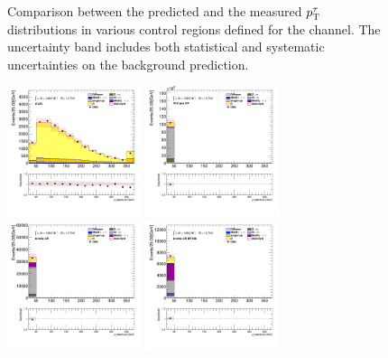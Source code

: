 \begin{figure}[!htp]
\begin{center}
			\end{center}
			\caption{
			Comparison between the predicted and the measured $p_{\text{T}}^{\tau}$ distributions in various control regions defined for the \taujets channel. The uncertainty band includes both statistical and systematic uncertainties on the background prediction. 
			}
			\label{fig:bkg-tau-pt-taujets}
		\end{figure}

		\begin{figure}[!htp]
			\begin{center}    
			\includegraphics[width=0.35\textwidth]{chapters/chapter6_HPlus/images/taujets/bjet_0_pt_TTBAR.png}
			\includegraphics[width=0.35\textwidth]{chapters/chapter6_HPlus/images/taujets/bjet_0_pt_WJETS.png} \\
			\includegraphics[width=0.35\textwidth]{chapters/chapter6_HPlus/images/taujets/bjet_0_pt_BVETO.png}
			\includegraphics[width=0.35\textwidth]{chapters/chapter6_HPlus/images/taujets/bjet_0_pt_BVETO_MT100.png} \\

\end{center}
\end{figure}

